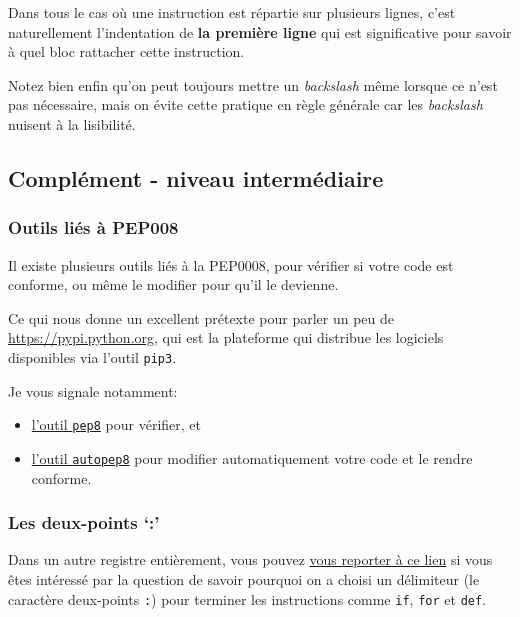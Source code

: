     Dans tous le cas où une instruction est répartie sur plusieurs lignes,
c'est naturellement l'indentation de \textbf{la première ligne} qui est
significative pour savoir à quel bloc rattacher cette instruction.

    Notez bien enfin qu'on peut toujours mettre un \emph{backslash} même
lorsque ce n'est pas nécessaire, mais on évite cette pratique en règle
générale car les \emph{backslash} nuisent à la lisibilité.

    \hypertarget{compluxe9ment---niveau-intermuxe9diaire}{%
\subsection{Complément - niveau
intermédiaire}\label{compluxe9ment---niveau-intermuxe9diaire}}

    \hypertarget{outils-liuxe9s-uxe0-pep008}{%
\subsubsection{Outils liés à PEP008}\label{outils-liuxe9s-uxe0-pep008}}

Il existe plusieurs outils liés à la PEP0008, pour vérifier si votre
code est conforme, ou même le modifier pour qu'il le devienne.

Ce qui nous donne un excellent prétexte pour parler un peu de
\url{https://pypi.python.org}, qui est la plateforme qui distribue les
logiciels disponibles via l'outil \texttt{pip3}.

Je vous signale notamment:

\begin{itemize}
\tightlist
\item
  \href{https://pypi.python.org/pypi/pep8/}{l'outil \texttt{pep8}} pour
  vérifier, et
\item
  \href{https://pypi.python.org/pypi/autopep8/}{l'outil
  \texttt{autopep8}} pour modifier automatiquement votre code et le
  rendre conforme.
\end{itemize}

    \hypertarget{les-deux-points}{%
\subsubsection{Les deux-points `:'}\label{les-deux-points}}

    Dans un autre registre entièrement, vous pouvez
\href{https://docs.python.org/3/faq/design.html\#why-are-colons-required-for-the-if-while-def-class-statements}{vous
reporter à ce lien} si vous êtes intéressé par la question de savoir
pourquoi on a choisi un délimiteur (le caractère deux-points \texttt{:})
pour terminer les instructions comme \texttt{if}, \texttt{for} et
\texttt{def}.


    
    
    
